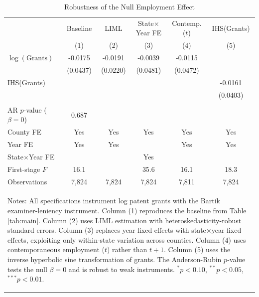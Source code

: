\begin{table}[htbp]
\centering
\caption{Robustness of the Null Employment Effect}
\label{tab:robust}
\begin{tabular}{lccccc}
\hline\hline
 & Baseline & LIML & State$\times$Year FE & Contemp. ($t$) & IHS(Grants) \\
 & (1) & (2) & (3) & (4) & (5) \\
\hline
$\log(\text{Grants})$ & -0.0175 & -0.0191 & -0.0039 & -0.0115 & \\
 & (0.0437) & (0.0220) & (0.0481) & (0.0472) & \\
IHS(Grants) & & & & & -0.0161 \\
 & & & & & (0.0403) \\
\\[6pt]
AR $p$-value ($\beta=0$) & 0.687 & & & & \\
County FE & Yes & Yes & Yes & Yes & Yes \\
Year FE & Yes & Yes & & Yes & Yes \\
State$\times$Year FE & & & Yes & & \\
First-stage $F$ & 16.1 & & 35.6 & 16.1 & 18.3 \\
Observations & 7,824 & 7,824 & 7,824 & 7,811 & 7,824 \\
\hline\hline
\multicolumn{6}{p{0.95\textwidth}}{\begin{flushleft}\small
Notes: All specifications instrument log patent grants with the Bartik examiner-leniency instrument. Column (1) reproduces the baseline from Table \ref{tab:main}. Column (2) uses LIML estimation with heteroskedasticity-robust standard errors. Column (3) replaces year fixed effects with state$\times$year fixed effects, exploiting only within-state variation across counties. Column (4) uses contemporaneous employment ($t$) rather than $t+1$. Column (5) uses the inverse hyperbolic sine transformation of grants. The Anderson-Rubin $p$-value tests the null $\beta = 0$ and is robust to weak instruments. $^{*}p<0.10$, $^{**}p<0.05$, $^{***}p<0.01$.
\end{flushleft}}
\end{tabular}
\end{table}
